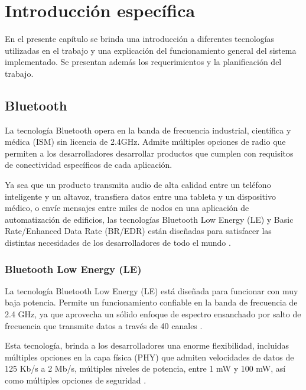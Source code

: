 \chapter{Introducción específica} %

\label{Chapter2}

En el presente capítulo se brinda una introducción a diferentes tecnologías utilizadas en el trabajo y una explicación del funcionamiento general del sistema implementado. Se presentan además los requerimientos y la planificación del trabajo.

\section{Bluetooth}

La tecnología Bluetooth opera en la banda de frecuencia industrial, científica y médica (ISM) sin licencia de 2.4GHz. Admite múltiples opciones de radio que permiten a los desarrolladores desarrollar productos que cumplen con requisitos de conectividad específicos de cada aplicación. 

Ya sea que un producto transmita audio de alta calidad entre un teléfono inteligente y un altavoz, transfiera datos entre una tableta y un dispositivo médico, o envíe mensajes entre miles de nodos en una aplicación de automatización de edificios, las tecnologías Bluetooth Low Energy (LE) y Basic Rate/Enhanced Data Rate (BR/EDR) están diseñadas para satisfacer las distintas necesidades de los desarrolladores de todo el mundo \cite{bluetooth}.


\subsection{Bluetooth Low Energy (LE)}

La tecnología Bluetooth Low Energy (LE) está diseñada para funcionar con muy baja potencia. Permite un funcionamiento confiable en la banda de frecuencia de 2.4 GHz, ya que aprovecha un sólido enfoque de espectro ensanchado por salto de frecuencia que transmite datos a través de 40 canales \cite{bluetooth}.

Esta tecnología, brinda a los desarrolladores una enorme flexibilidad, incluidas múltiples opciones en la capa física (PHY) que admiten velocidades de datos de 125 Kb/s a 2 Mb/s, múltiples niveles de potencia, entre 1 mW y 100 mW, así como múltiples opciones de seguridad \cite{bluetooth}. 

